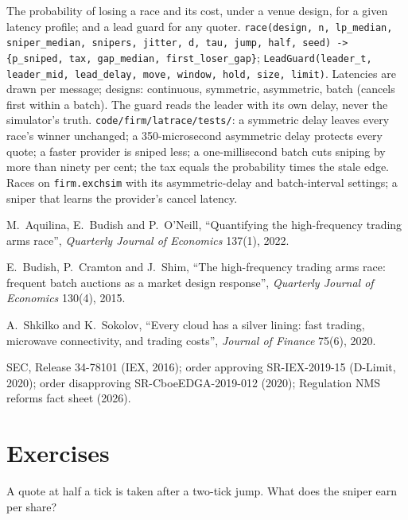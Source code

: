 \begin{build}
 The probability of losing a race and its cost, under a venue design, for a given latency profile; and a lead guard for any quoter.
 \texttt{race(design, n, lp\_median, sniper\_median, snipers, jitter, d, tau, jump, half, seed) -> \{p\_sniped, tax,
gap\_median, first\_loser\_gap\}}; \texttt{LeadGuard(leader\_t, leader\_mid, lead\_delay, move, window, hold, size, limit)}.
 Latencies are drawn per message; designs: continuous, symmetric, asymmetric, batch (cancels first within a batch). The guard reads
the leader with its own delay, never the simulator's truth.
 \texttt{code/firm/latrace/tests/}: a symmetric delay leaves every race's winner unchanged; a 350-microsecond asymmetric delay
protects every quote; a faster provider is sniped less; a one-millisecond batch cuts sniping by more than ninety per cent; the tax equals the
probability times the stale edge.
 Races on \texttt{firm.exchsim} with its asymmetric-delay and batch-interval settings; a sniper that learns the provider's cancel
latency.
\end{build}

\begin{omsources}
\item M.~Aquilina, E.~Budish and P.~O'Neill, ``Quantifying the high-frequency trading arms race'', \emph{Quarterly Journal of Economics} 137(1), 2022.
\item E.~Budish, P.~Cramton and J.~Shim, ``The high-frequency trading arms race: frequent batch auctions as a market design response'',
\emph{Quarterly Journal of Economics} 130(4), 2015.
\item A.~Shkilko and K.~Sokolov, ``Every cloud has a silver lining: fast trading, microwave connectivity, and trading costs'', \emph{Journal of
Finance} 75(6), 2020.
\item SEC, Release 34-78101 (IEX, 2016); order approving SR-IEX-2019-15 (D-Limit, 2020); order disapproving SR-CboeEDGA-2019-012 (2020); Regulation
NMS reforms fact sheet (2026).
\end{omsources}

\section{Exercises}

\begin{exercise}[$\star$]\label{exo:hf:latency-arbitrage-and-its-defence:1}
A quote at half a tick is taken after a two-tick jump. What does the sniper earn per share?
\end{exercise}


